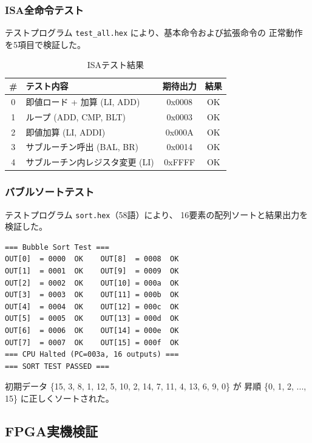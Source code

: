 \documentclass[a4paper,11pt]{ltjsarticle}
\begin{document}
\subsubsection{ISA全命令テスト}

テストプログラム \texttt{test\_all.hex} により、基本命令および拡張命令の
正常動作を5項目で検証した。

\begin{table}[h]
\centering
\caption{ISAテスト結果}
\begin{tabular}{clcc}
\toprule
\# & テスト内容 & 期待出力 & 結果 \\
\midrule
0 & 即値ロード + 加算 (LI, ADD)          & 0x0008 & OK \\
1 & ループ (ADD, CMP, BLT)               & 0x0003 & OK \\
2 & 即値加算 (LI, ADDI)                  & 0x000A & OK \\
3 & サブルーチン呼出 (BAL, BR)            & 0x0014 & OK \\
4 & サブルーチン内レジスタ変更 (LI)       & 0xFFFF & OK \\
\bottomrule
\end{tabular}
\end{table}

\subsubsection{バブルソートテスト}

テストプログラム \texttt{sort.hex}（58語）により、
16要素の配列ソートと結果出力を検証した。

\begin{lstlisting}[language={},frame=single,caption={バブルソートテスト結果}]
=== Bubble Sort Test ===
OUT[0]  = 0000  OK    OUT[8]  = 0008  OK
OUT[1]  = 0001  OK    OUT[9]  = 0009  OK
OUT[2]  = 0002  OK    OUT[10] = 000a  OK
OUT[3]  = 0003  OK    OUT[11] = 000b  OK
OUT[4]  = 0004  OK    OUT[12] = 000c  OK
OUT[5]  = 0005  OK    OUT[13] = 000d  OK
OUT[6]  = 0006  OK    OUT[14] = 000e  OK
OUT[7]  = 0007  OK    OUT[15] = 000f  OK
=== CPU Halted (PC=003a, 16 outputs) ===
=== SORT TEST PASSED ===
\end{lstlisting}

初期データ \{15, 3, 8, 1, 12, 5, 10, 2, 14, 7, 11, 4, 13, 6, 9, 0\} が
昇順 \{0, 1, 2, ..., 15\} に正しくソートされた。

\subsection{FPGA実機検証}
\end{document}
